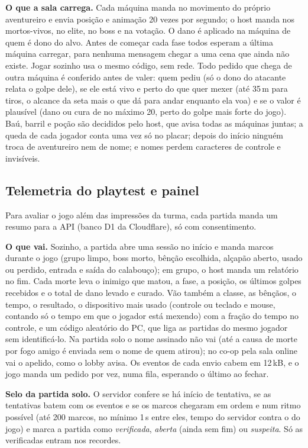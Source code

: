\documentclass[11pt,a4paper]{article}
\begin{document}
\textbf{O que a sala carrega.} Cada máquina manda no movimento do próprio aventureiro e envia posição e animação 20 vezes por segundo; o host manda nos mortos-vivos, no elite, no boss e na votação. O dano é aplicado na máquina de quem é dono do alvo. Antes de começar cada fase todos esperam a última máquina carregar, para nenhuma mensagem chegar a uma cena que ainda não existe. Jogar sozinho usa o mesmo código, sem rede. Todo pedido que chega de outra máquina é conferido antes de valer: quem pediu (só o dono do atacante relata o golpe dele), se ele está vivo e perto do que quer mexer (até 35\,m para tiros, o alcance da seta mais o que dá para andar enquanto ela voa) e se o valor é plausível (dano ou cura de no máximo 20, perto do golpe mais forte do jogo). Baú, barril e poção são decididos pelo host, que avisa todas as máquinas juntas; a queda de cada jogador conta uma vez só no placar; depois do início ninguém troca de aventureiro nem de nome; e nomes perdem caracteres de controle e invisíveis.

\subsection{Telemetria do playtest e painel}

Para avaliar o jogo além das impressões da turma, cada partida manda um resumo para a API (banco D1 da Cloudflare), só com consentimento.

\textbf{O que vai.} Sozinho, a partida abre uma sessão no início e manda marcos durante o jogo (grupo limpo, boss morto, bênção escolhida, alçapão aberto, usado ou perdido, entrada e saída do calabouço); em grupo, o host manda um relatório no fim. Cada morte leva o inimigo que matou, a fase, a posição, os últimos golpes recebidos e o total de dano levado e curado. Vão também a classe, as bênçãos, o tempo, o resultado, o dispositivo mais usado (controle ou teclado e mouse, contando só o tempo em que o jogador está mexendo) com a fração do tempo no controle, e um código aleatório do PC, que liga as partidas do mesmo jogador sem identificá-lo. Na partida solo o nome assinado não vai (até a causa de morte por fogo amigo é enviada sem o nome de quem atirou); no co-op pela sala online vai o apelido, como o lobby avisa. Os eventos de cada envio cabem em 12\,kB, e o jogo manda um pedido por vez, numa fila, esperando o último ao fechar.

\textbf{Selo da partida solo.} O servidor confere se há início de tentativa, se as tentativas batem com os eventos e se os marcos chegaram em ordem e num ritmo possível (até 200 marcos, no mínimo 1\,s entre eles, tempo do servidor contra o do jogo) e marca a partida como \emph{verificada}, \emph{aberta} (ainda sem fim) ou \emph{suspeita}. Só as verificadas entram nos recordes.
\end{document}
